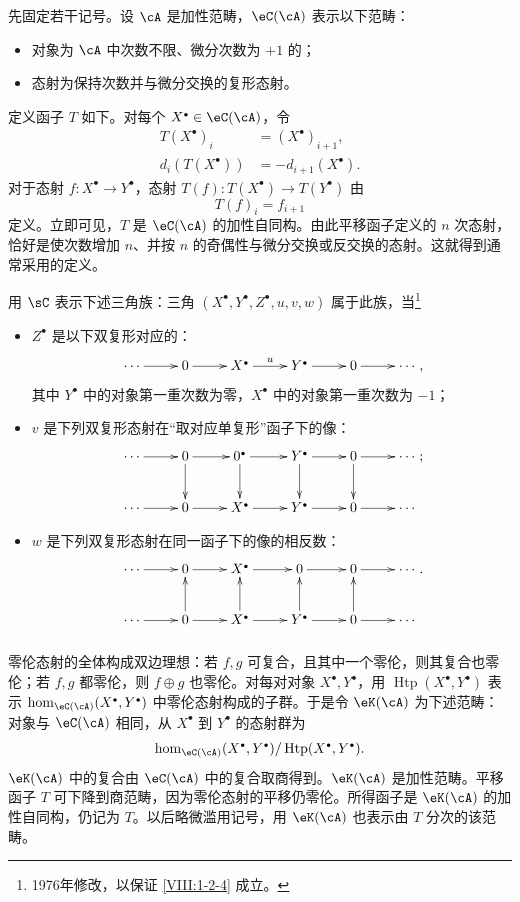 \subsubsection{}\label{VIII:1-2-1}
先固定若干记号。设 $\cA$ 是加性范畴，$\eC(\cA)$ 表示以下范畴：
\begin{itemize}
\item 对象为 $\cA$ 中次数不限、微分次数为 $+1$ 的；
\item 态射为保持次数并与微分交换的复形态射。
\end{itemize}
定义函子 $T$ 如下。对每个 $X^\bullet\in\eC(\cA)$，令
\begin{align*}
 T(X^\bullet)_i&=(X^\bullet)_{i+1},\\
 d_i(T(X^\bullet))&=-d_{i+1}(X^\bullet).
\end{align*}
对于态射 $f:X^\bullet\to Y^\bullet$，态射 $T(f):T(X^\bullet)\to T(Y^\bullet)$ 由
\[T(f)_i=f_{i+1}\]
定义。立即可见，$T$ 是 $\eC(\cA)$ 的加性自同构。由此平移函子定义的 $n$ 次态射，恰好是使次数增加 $n$、并按 $n$ 的奇偶性与微分交换或反交换的态射。这就得到通常采用的定义。

用 $\sC$ 表示下述三角族：三角 $(X^\bullet,Y^\bullet,Z^\bullet,u,v,w)$ 属于此族，当\footnote{1976年修改，以保证 \ref{VIII:1-2-4} 成立。}
\begin{itemize}
\item $Z^\bullet$ 是以下双复形对应的：
\[\xymatrix{\cdots\ar[r]&0\ar[r]&X^\bullet\ar[r]^-u&Y^\bullet\ar[r]&0\ar[r]&\cdots},\]
其中 $Y^\bullet$ 中的对象第一重次数为零，$X^\bullet$ 中的对象第一重次数为 $-1$；
\item $v$ 是下列双复形态射在“取对应单复形”函子下的像：
\[\xymatrix{
\cdots\ar[r]&0\ar[r]\ar[d]&0^\bullet\ar[r]\ar[d]&Y^\bullet\ar[r]\ar[d]&0\ar[r]\ar[d]&\cdots\\
\cdots\ar[r]&0\ar[r]&X^\bullet\ar[r]&Y^\bullet\ar[r]&0\ar[r]&\cdots};\]
\item $w$ 是下列双复形态射在同一函子下的像的相反数：
\[\xymatrix{
\cdots\ar[r]&0\ar[r]&X^\bullet\ar[r]&0\ar[r]&0\ar[r]&\cdots\\
\cdots\ar[r]&0\ar[r]\ar[u]&X^\bullet\ar[r]\ar[u]&Y^\bullet\ar[r]\ar[u]&0\ar[r]\ar[u]&\cdots}.
\]
\end{itemize}
\subsubsection{}\label{VIII:1-2-2}
零伦态射的全体构成双边理想：若 $f,g$ 可复合，且其中一个零伦，则其复合也零伦；若 $f,g$ 都零伦，则 $f\oplus g$ 也零伦。对每对对象 $X^\bullet,Y^\bullet$，用 $\operatorname{Htp}(X^\bullet,Y^\bullet)$ 表示 $\hom_{\eC(\cA)}(X^\bullet,Y^\bullet)$ 中零伦态射构成的子群。于是令 $\eK(\cA)$ 为下述范畴：对象与 $\eC(\cA)$ 相同，从 $X^\bullet$ 到 $Y^\bullet$ 的态射群为
\[
 \hom_{\eC(\cA)}(X^\bullet,Y^\bullet)/\operatorname{Htp}(X^\bullet,Y^\bullet).
\]
$\eK(\cA)$ 中的复合由 $\eC(\cA)$ 中的复合取商得到。$\eK(\cA)$ 是加性范畴。平移函子 $T$ 可下降到商范畴，因为零伦态射的平移仍零伦。所得函子是 $\eK(\cA)$ 的加性自同构，仍记为 $T$。以后略微滥用记号，用 $\eK(\cA)$ 也表示由 $T$ 分次的该范畴。

